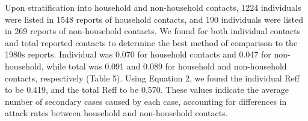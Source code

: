 Upon stratification into household and non-household contacts, 1224 individuals were listed in 1548 reports of household contacts, and 190 individuals were listed in 269 reports of non-household contacts. We found for both individual contacts and total reported contacts to determine the best method of comparison to the 1980s reports. Individual was 0.070 for household contacts and 0.047 for non-household, while total was 0.091 and 0.089 for household and non-household contacts, respectively (Table 5). Using Equation 2, we found the individual Reff to be 0.419, and the total Reff to be 0.570. These values indicate the average number of secondary cases caused by each case, accounting for differences in attack rates between household and non-household contacts.